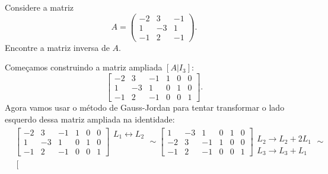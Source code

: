 \begin{exemplo}
    Considere a matriz
    \[
        A = \begin{pmatrix}
            -2 & 3 & -1\\
            1 & -3 & 1\\
            -1 & 2 & -1
        \end{pmatrix}.
    \]
    Encontre a matriz inversa de $A$.
    \begin{solucao}
        Começamos construindo a matriz ampliada $[A|I_3]$:
        \[
            \left[\begin{array}{ccc|ccc}
            -2 & 3 & -1 & 1 & 0 & 0\\
            1 & -3 & 1 & 0 & 1 & 0\\
            -1 & 2 & -1 & 0 & 0 & 1
        \end{array}\right].
        \]
        Agora vamos usar o método de Gauss-Jordan para tentar transformar o  lado esquerdo dessa matriz ampliada na identidade:
        \begin{align*}
            &\left[
                \begin{array}{ccc|ccc}
                    -2 & 3 & -1 & 1 & 0 & 0\\
                    1 & -3 & 1 & 0 & 1 & 0\\
                    -1 & 2 & -1 & 0 & 0 & 1
                \end{array}
            \right]
            \begin{array}{l}
                L_1 \leftrightarrow L_2\\\phantom{x}\\\phantom{x}
            \end{array}\sim
            \left[
                \begin{array}{ccc|ccc}
                    1 & -3 & 1 & 0 & 1 & 0\\
                    -2 & 3 & -1 & 1 & 0 & 0\\
                    -1 & 2 & -1 & 0 & 0 & 1
                \end{array}
            \right]
            \begin{array}{l}
                \phantom{x}\\L_2 \to L_2 + 2L_1\\L_3 \to L_3 + L_1
            \end{array}\sim\\
            &\left[
                \begin{array}{ccc|ccc}

\end{array}
\end{align*}
\end{solucao}
\end{exemplo}
